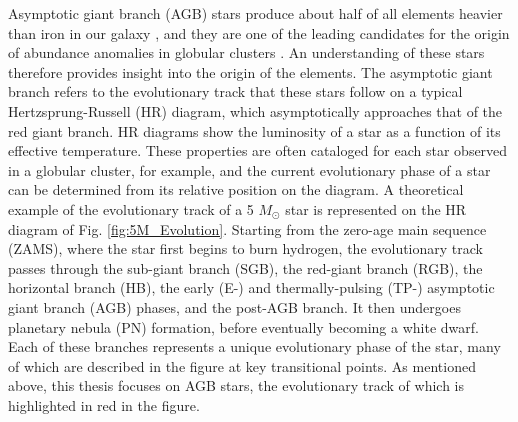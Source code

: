 Asymptotic giant branch (AGB) stars produce about half of all elements heavier than iron in our galaxy \cite{Busso1999}, and they are one of the leading candidates for the origin of abundance anomalies in globular clusters \cite{Prantzos2007}. An understanding of these stars therefore provides insight into the origin of the elements. The asymptotic giant branch refers to the evolutionary track that these stars follow on a typical Hertzsprung-Russell (HR) diagram, which asymptotically approaches that of the red giant branch. HR diagrams show the luminosity of a star as a function of its effective temperature. These properties are often cataloged for each star observed in a globular cluster, for example, and the current evolutionary phase of a star can be determined from its relative position on the diagram. A theoretical example of the evolutionary track of a 5 $M_{\odot}$ star is represented on the HR diagram of Fig. \ref{fig:5M_Evolution}. Starting from the zero-age main sequence (ZAMS), where the star first begins to burn hydrogen, the evolutionary track passes through the sub-giant branch (SGB), the red-giant branch (RGB), the horizontal branch (HB), the early (E-) and thermally-pulsing (TP-) asymptotic giant branch (AGB) phases, and the post-AGB branch. It then undergoes planetary nebula (PN) formation, before eventually becoming a white dwarf. Each of these branches represents a unique evolutionary phase of the star, many of which are described in the figure at key transitional points. As mentioned above, this thesis focuses on AGB stars, the evolutionary track of which is highlighted in red in the figure.

